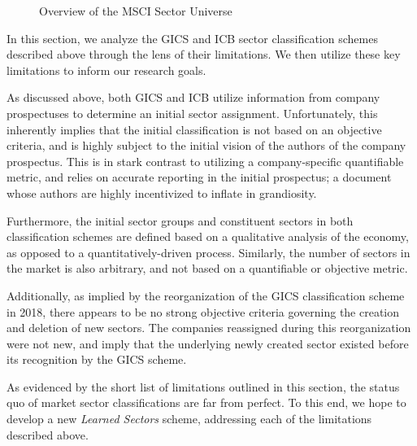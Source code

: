 \documentclass[../main.tex]{subfiles}
\begin{document}
\begin{figure}
    \centering
    \vspace{\wrapfigadjustment}
    \caption{Overview of the MSCI Sector Universe}
    \label{fig:introduction:icb_breakdown}
\end{figure}

In this section, we analyze the GICS and ICB sector classification schemes described above through the lens of their limitations. We then utilize these key limitations to inform our research goals.

As discussed above, both GICS and ICB utilize information from company prospectuses to determine an initial sector assignment. Unfortunately, this inherently implies that the initial classification is not based on an objective criteria, and is highly subject to the initial vision of the authors of the company prospectus. This is in stark contrast to utilizing a company-specific quantifiable metric, and relies on accurate reporting in the initial prospectus; a document whose authors are highly incentivized to inflate in grandiosity.

Furthermore, the initial sector groups and constituent sectors in both classification schemes are defined based on a qualitative analysis of the economy, as opposed to a quantitatively-driven process. Similarly, the number of sectors in the market is also arbitrary, and not based on a quantifiable or objective metric.

Additionally, as implied by the reorganization of the GICS classification scheme in 2018, there appears to be no strong objective criteria governing the creation and deletion of new sectors. The companies reassigned during this reorganization were not new, and imply that the underlying newly created sector existed before its recognition by the GICS scheme.

As evidenced by the short list of limitations outlined in this section, the status quo of market sector classifications are far from perfect. To this end, we hope to develop a new \textit{Learned Sectors} scheme, addressing each of the limitations described above.
\end{document}
